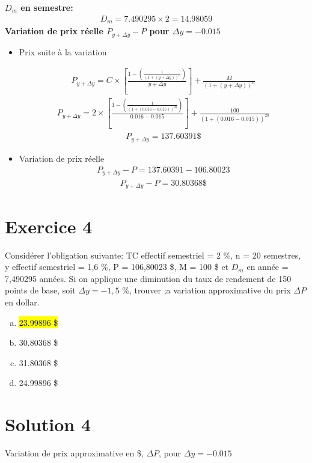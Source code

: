 \documentclass[10pt,a4paper]{article}
\begin{document}
\textbf{$D_m$ en semestre:} 
\begin{align*}
D_m=7.490295 \times 2 = 14.98059
\end{align*}
\textbf{Variation de prix réelle $P_{y+\Delta y} - P$ pour $\Delta y = -0.015$}
\begin{itemize}
\item Prix suite à la variation 

\begin{align*}
P_{y+\Delta y}=C \times \left[ \frac{1-\left(\frac{1}{(1+(y+\Delta y))^n} \right)}{y+\Delta y} \right]+\frac{M}{(1+(y+\Delta y))^n}
\end{align*}
\begin{align*}
P_{y+\Delta y}=2 \times \left[ \frac{1-\left(\frac{1}{(1+(0.016-0.015))^{20}} \right)}{0.016-0.015} \right]+\frac{100}{(1+(0.016-0.015))^{20}}
\end{align*}
\begin{align*}
P_{y+\Delta y}=137.60391 \$
\end{align*}

\item Variation de prix réelle 
\begin{align*}
P_{y+\Delta y}-P=137.60391- 106.80023 
\end{align*}
\begin{align*}
P_{y+\Delta y}-P=30.80368\$
\end{align*}
\end{itemize}

\newpage


\section*{Exercice 4}
Considérer l’obligation suivante: TC effectif semestriel = 2 \%, n = 20 semestres, y effectif semestriel = 1,6 \%, P = 106,80023 \$, M = 100 \$ et $D_m$ en année = 7,490295 années.  Si on applique une diminution du taux de rendement de 150 points de base,  soit $\Delta y = -1,5$ \%,  trouver ;a variation approximative du prix $\Delta P$ en dollar.


\begin{enumerate}[a)]
\item \hl{23.99896 \$}
\item 30.80368 \$
\item 31.80368 \$
\item  24.99896 \$
\end{enumerate}

\section*{Solution 4}
Variation de prix approximative en \$, $\Delta P$, pour $\Delta y = -0.015$
\end{document}
